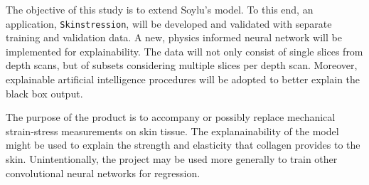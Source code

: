 The objective of this study is to extend Soylu's model.
To this end, an application, \texttt{Skinstression}, will be developed and validated with separate training and validation data.
A new, physics informed neural network will be implemented for explainability.
The data will not only consist of single slices from depth scans, but of subsets considering multiple slices per depth scan.
Moreover, explainable artificial intelligence procedures will be adopted to better explain the black box output.

The purpose of the product is to accompany or possibly replace mechanical strain-stress measurements on skin tissue.
The explanainability of the model might be used to explain the strength and elasticity that collagen provides to the skin.
Unintentionally, the project may be used more generally to train other convolutional neural networks for regression.

